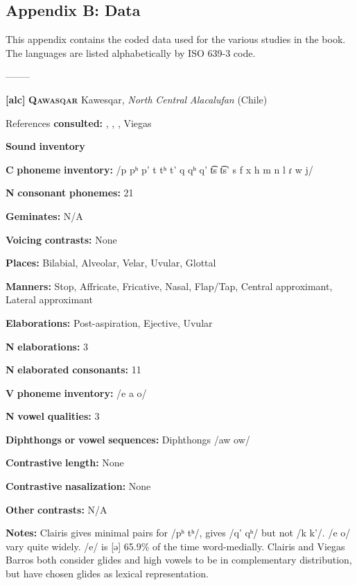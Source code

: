 
\subsection{Appendix B: Data}
\begin{styleBody}
This appendix contains the coded data used for the various studies in the book. The languages are listed alphabetically by ISO 639-3 code.

--------

\textbf{[alc]}   \textbf{\textsc{Qawasqar}}  Kawesqar, \textit{North} \textit{Central} \textit{Alacalufan} (Chile)

References \textbf{consulted:} \citet{Aguilera2001}, \citet{Clairis1977}, \citet{Clairis1985}, Viegas \citet{Barros1990}

\textbf{Sound} \textbf{inventory}

\textbf{C} \textbf{phoneme} \textbf{inventory:} /p pʰ p’ t tʰ t’ q qʰ q’ t͡s t͡s’ s f x h m n l ɾ w j/

\textbf{N} \textbf{consonant} \textbf{phonemes:} 21

\textbf{Geminates:} N/A

\textbf{Voicing} \textbf{contrasts:} None

\textbf{Places:} Bilabial, Alveolar, Velar, Uvular, Glottal

\textbf{Manners:} Stop, Affricate, Fricative, Nasal, Flap/Tap, Central approximant, Lateral approximant

\textbf{Elaborations:} Post-aspiration, Ejective, Uvular

\textbf{N} \textbf{elaborations:} 3

\textbf{N} \textbf{elaborated} \textbf{consonants:} 11

\textbf{V} \textbf{phoneme} \textbf{inventory:} /e a o/

\textbf{N} \textbf{vowel} \textbf{qualities:} 3

\textbf{Diphthongs} \textbf{or} \textbf{vowel} \textbf{sequences:} Diphthongs /aw ow/

\textbf{Contrastive} \textbf{length:} None

\textbf{Contrastive} \textbf{nasalization:} None

\textbf{Other} \textbf{contrasts:} N/A

\textbf{Notes:} Clairis gives minimal pairs for /pʰ tʰ/, gives /q’ qʰ/ but not /k k’/. /e o/ vary quite widely. /e/ is [ə] 65.9\% of the time word-medially. Clairis and Viegas Barros both consider glides and high vowels to be in complementary distribution, but have chosen glides as lexical representation.


\end{styleBody}
